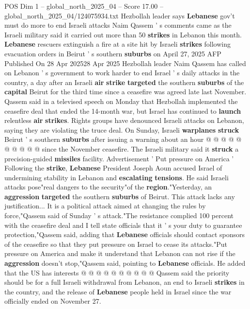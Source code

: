 \begin{textsample}{POS Dim 1 – global\_north\_2025\_04 – Score 17.00 – global\_north\_2025\_04/124075934.txt}  \label{ex:f1_pos_413}
Hezbollah leader says \textbf{Lebanese} gov't must do more to end Israeli attacks Naim Qassem ' s comments came as the Israeli military said it carried out more than 50 \textbf{strikes} in Lebanon this month. \textbf{Lebanese} rescuers extinguish a fire at a site hit by Israeli \textbf{strikes} following evacuation orders in Beirut ' s southern \textbf{suburbs} on April 27, 2025 AFP Published On 28 Apr 202528 Apr 2025 Hezbollah leader Naim Qassem has called on Lebanon ' s government to work harder to end Israel ' s daily attacks in the country, a day after an Israeli \textbf{air} \textbf{strike} \textbf{targeted} the southern \textbf{suburbs} of the \textbf{capital} Beirut for the third time since a ceasefire was agreed late last November.
Qassem said in a televised speech on Monday that Hezbollah implemented the ceasefire deal that ended the 14-month war, but Israel has continued to \textbf{launch} relentless \textbf{air} \textbf{strikes}.
Rights groups have denounced Israeli attacks on Lebanon, saying they are violating the truce deal.
On Sunday, Israeli \textbf{warplanes} \textbf{struck} Beirut ' s southern \textbf{suburbs} after issuing a warning about an hour @ @ @ @ @ @ @ @ @ @ since the November ceasefire.
The Israeli military said it \textbf{struck} a precision-guided \textbf{missiles} facility.
Advertisement ' Put pressure on America ' Following the \textbf{strike}, \textbf{Lebanese} President Joseph Aoun accused Israel of undermining stability in Lebanon and \textbf{escalating} \textbf{tensions}.
He said Israeli attacks pose"real dangers to the security"of the \textbf{region}."Yesterday, an \textbf{aggression} \textbf{targeted} the southern \textbf{suburbs} of Beirut.
This attack lacks any justification...
It is a political attack aimed at changing the rules by force,"Qassem said of Sunday ' s attack."The resistance complied 100 percent with the ceasefire deal and I tell state officials that it ' s your duty to guarantee protection,"Qassem said, adding that \textbf{Lebanese} officials should contact sponsors of the ceasefire so that they put pressure on Israel to cease its attacks."Put pressure on America and make it understand that Lebanon can not rise if the \textbf{aggression} doesn't stop,"Qassem said, pointing to \textbf{Lebanese} officials.
He added that the US has interests @ @ @ @ @ @ @ @ @ @ Qassem said the priority should be for a full Israeli withdrawal from Lebanon, an end to Israeli \textbf{strikes} in the country, and the release of \textbf{Lebanese} people held in Israel since the war officially ended on November 27.

\end{textsample}
